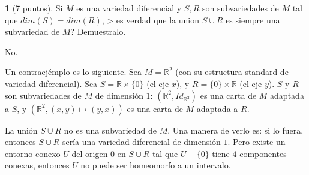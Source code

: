 \documentclass[12pt,a4paper]{report}
\theoremstyle{definition}
\newtheorem{ex}{}
\newcommand{\RR}{\ensuremath{\mathbb R}}
\begin{document}
\begin{ex}[7 puntos]
Si $M$ es una variedad diferencial y $S,R$ son subvariedades de $M$ tal que $dim(S)=dim(R)$, > es verdad que la union $S\cup R$ es siempre  una subvariedad de $M$? Demuestralo.
\end{ex}
 \begin{it}
No.

Un contraej\'emplo es lo siguiente. Sea $M=\RR^2$ (con su estructura standard de variedad diferencial). Sea $S=\RR\times \{0\}$ (el eje $x$), y $R=\{0\}\times \RR$ (el eje $y$). $S$ y $R$ son subvariedades de $M$ de dimensi\'on $1$: $(\RR^2,Id_{\RR^2})$ es una carta de $M$ adaptada a $S$, y $(\RR^2,(x,y)\mapsto(y,x))$ es una carta de $M$ adaptada a $R$.

La uni\'on $S\cup R$ no es una subvariedad de $M$. Una manera de verlo es: si lo fuera, entonces $S\cup R$ ser\'ia una variedad diferencial de dimensi\'on $1$.
Pero existe un entorno conexo $U$ del origen $0$ en $S\cup R$  tal que $U-\{0\}$ tiene $4$ componentes conexas, entonces $U$ no puede ser homeomorfo a un intervalo.
\end{it}
 







 
\end{document}

